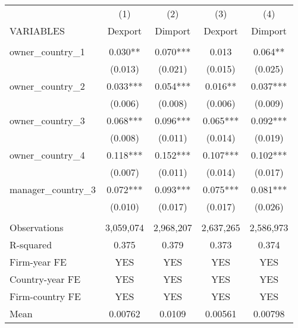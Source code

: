 \begin{tabular}{lcccc} \hline
 & (1) & (2) & (3) & (4) \\
VARIABLES & Dexport & Dimport & Dexport & Dimport \\ \hline
 &  &  &  &  \\
owner\_country\_1 & 0.030** & 0.070*** & 0.013 & 0.064** \\
 & (0.013) & (0.021) & (0.015) & (0.025) \\
owner\_country\_2 & 0.033*** & 0.054*** & 0.016** & 0.037*** \\
 & (0.006) & (0.008) & (0.006) & (0.009) \\
owner\_country\_3 & 0.068*** & 0.096*** & 0.065*** & 0.092*** \\
 & (0.008) & (0.011) & (0.014) & (0.019) \\
owner\_country\_4 & 0.118*** & 0.152*** & 0.107*** & 0.102*** \\
 & (0.007) & (0.011) & (0.014) & (0.017) \\
manager\_country\_3 & 0.072*** & 0.093*** & 0.075*** & 0.081*** \\
 & (0.010) & (0.017) & (0.017) & (0.026) \\
 &  &  &  &  \\
Observations & 3,059,074 & 2,968,207 & 2,637,265 & 2,586,973 \\
R-squared & 0.375 & 0.379 & 0.373 & 0.374 \\
Firm-year FE & YES & YES & YES & YES \\
Country-year FE & YES & YES & YES & YES \\
Firm-country FE & YES & YES & YES & YES \\
 Mean & 0.00762 & 0.0109 & 0.00561 & 0.00798 \\ \hline
\end{tabular}
